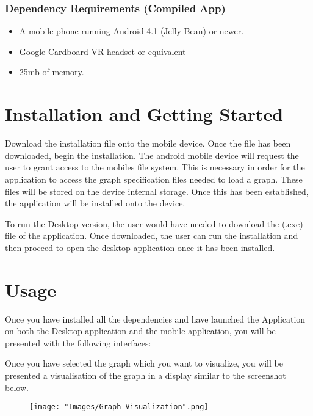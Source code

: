 \documentclass[english]{article}
\begin{document}
\subsubsection{Dependency Requirements (Compiled App)}

\begin{itemize}
   \item A mobile phone running Android 4.1 (Jelly Bean) or newer.
   \item Google Cardboard VR headset or equivalent
   \item 25mb of memory. 
\end{itemize} 


\section{Installation and Getting Started}
Download the installation file onto the mobile device. Once the file has been downloaded, begin the installation. The android mobile device will request the user to grant access to the mobiles file system. This is necessary in order for the application to access the graph specification files needed to load a graph. These files will be stored on the device internal storage. Once this has been established, the application will be installed onto the device. 

To run the Desktop version, the user would have needed to download the (.exe) file of the application. Once downloaded, the user can run the installation and then proceed to open the desktop application once it has been installed. 

\section{Usage}
\begin{flushleft}
Once you have installed all the dependencies and have launched the Application on both the Desktop application and the mobile application, you will be presented with the following interfaces:

Once you have selected the graph which you want to visualize, you will be presented a visualisation of the graph in a display similar to the screenshot below.
\end{flushleft}
    
\begin{figure}
	\centering
	\texttt{[image: "Images/Graph Visualization".png]}
\end{figure}
\end{document}

